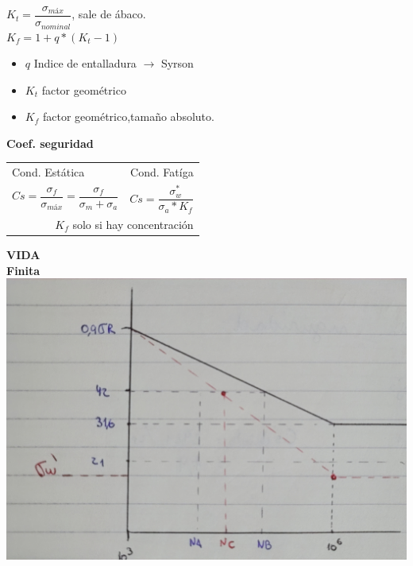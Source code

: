 \documentclass[11pt,a4paper]{article}
\begin{document}
\begin{multicols}{2}
\begin{cajita}
	$K_{t}=\dfrac{\sigma_{máx}}{\sigma_{nominal}}$, sale de ábaco.\\ \vspace*{0.2cm}
	$K_{f}=1+q*\left(K_{t}-1\right)$
		\begin{itemize}[itemsep=-2mm]
		\item $q$ Indice de entalladura $\rightarrow$ Syrson
		\item $K_{t}$ factor geométrico
		\item $K_{f}$ factor geométrico,tamaño absoluto.
	\end{itemize}

	\textbf{Coef. seguridad}\\
		\begin{tabular}{l r}
			\hline
			Cond. Estática & Cond. Fatíga\\
			$Cs=\dfrac{\sigma_{f}}{\sigma_{máx}}=\dfrac{\sigma_{f}}{\sigma_{m}+\sigma_{a}}$ & $Cs=\dfrac{\sigma_{w}^{*}}{\sigma_{a}*K_{f}}$ \\
			\multicolumn{2}{r}{ $K_{f}$ solo si hay concentración} \\
			\hline
		\end{tabular}
	
	\newpage
	
	\textbf{VIDA}\\
	\textbf{Finita}\\
	

	\includegraphics[height=0.8\textwidth, angle=90]{fluencia}
	
	

\end{cajita}
\end{multicols}
\end{document}
